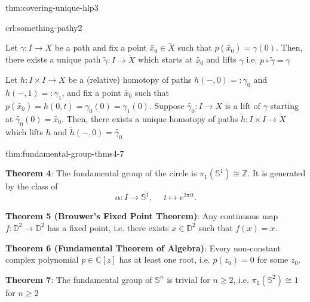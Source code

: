 \documentclass[landscape, 8pt]{extarticle}
\begin{document}
\begin{multicols*}{3}
\begin{thm}{thm:covering-unique-hlp}{3}
\end{thm}

\vspace{-7pt}
\begin{crl}[]{crl:something-pathy}{2}
	\vspace{-2pt}
	\begin{enumerate-zero}
	    \item Let $\gamma : I \to X$ be a path and fix a point $\tilde{x_{0}}\in \tilde{X}$ such that $p(\tilde{x_{0}}) = \gamma(0)$. Then, there exists a unique path $\tilde{\gamma} : I \to \tilde{X}$ which starts at $\tilde{x_{0}}$ and lifts $\gamma$ i.e. $p \circ \tilde{\gamma} = \gamma$
	    \item Let $h : I \times I \to X$ be a (relative) homotopy of paths $h(-, 0) =: \gamma_{0}$ and $h(-, 1) =: \gamma_{1}$, and fix a point $\tilde{x_{0}}$ such that $p(\tilde{x_{0}}) = h(0, t) = \gamma_{0}(0) = \gamma_{1}(0)$. Suppose $\tilde{\gamma_{0}} : I \to X$ is a lift of $\gamma$ starting at $\tilde{\gamma_{0}}(0) = \tilde{x_{0}}$. Then, there exists a unique homotopy of paths $\tilde{h} : I \times I \to \tilde{X}$ which lifts $h$ and $\tilde{h}(-, 0) = \tilde{\gamma_{0}}$
	\end{enumerate-zero}
\end{crl}

\begin{thm}{thm:fundamental-group-thms}{4-7}
	\vspace{-2pt}
	\begin{itemize-zero}
		\item \textbf{Theorem 4}: The fundamental group of the circle is $\pi_{1}(\mathbb{S}^{1}) \cong \mathbb{Z}$. It is generated by the class of
			\[\alpha : I \to \mathbb{S}^{1},\;\quad t \mapsto e^{2\pi i t}.\]
			\par\vspace{-5pt}
	\vspace{-2pt}
		\item \textbf{Theorem 5 (Brouwer's Fixed Point Theorem)}: Any continuous map $f : \mathbb{D}^{2} \to \mathbb{D}^{2}$ has a fixed point, i.e. there exists $x \in \mathbb{D}^{2}$ such that $f(x) = x$.
	\vspace{-2pt}
		\item \textbf{Theorem 6 (Fundamental Theorem of Algebra)}: Every non-constant complex polynomial $p\in \mathbb{C}[z]$ has at least one root, i.e. $p(z_{0}) = 0$ for some $z_{0}$.
	\vspace{-2pt}
		\item \textbf{Theorem 7}: The fundamental group of $\mathbb{S}^{n}$ is trivial for $n \ge 2$, i.e. $\pi_{1}(\mathbb{S}^{2}) \cong 1$ for $n \ge 2$
	\end{itemize-zero}
\end{thm}


\end{multicols*}
\end{document}
